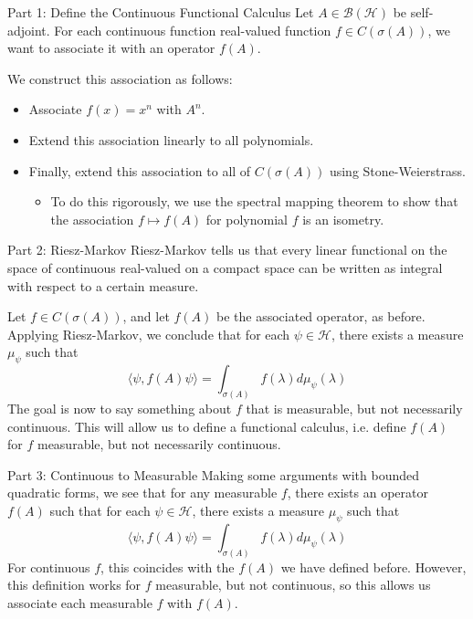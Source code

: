 \documentclass{beamer}
\theoremstyle{plain}
\theoremstyle{definition}
\renewcommand{\l}{\lambda}
\newcommand{\s}{\sigma}
\newcommand{\cB}{{\mathcal B}}
\newcommand{\cH}{{\mathcal H}}
\begin{document}
\begin{frame}{Part 1: Define the Continuous Functional Calculus}
    Let $A \in \cB(\cH)$ be self-adjoint. For each continuous function real-valued function $f \in C(\s(A))$, we want to associate it with an operator $f(A)$.

    \bigskip
    We construct this association as follows:
    \begin{itemize}
        \item Associate $f(x) = x^n$ with $A^n$.
        \item Extend this association linearly to all polynomials.
        \item Finally, extend this association to all of $C(\s(A))$ using Stone-Weierstrass.
            \begin{itemize}
                \item To do this rigorously, we use the spectral mapping theorem to show that the association $f \mapsto f(A)$ for polynomial $f$ is an isometry.
            \end{itemize}
    \end{itemize}
\end{frame}

\begin{frame}{Part 2: Riesz-Markov}
    Riesz-Markov tells us that every linear functional on the space of continuous real-valued on a compact space can be written as integral with respect to a certain measure.

    \medskip
    Let $f \in C(\s(A))$, and let $f(A)$ be the associated operator, as before. Applying Riesz-Markov, we conclude that for each $\psi \in \cH$, there exists a measure $\mu_\psi$ such that
    \[
        \langle \psi, f(A)\psi \rangle = \int_{\s(A)} f(\l)d\mu_\psi(\l)
    \]
    The goal is now to say something about $f$ that is measurable, but not necessarily continuous. This will allow us to define a functional calculus, i.e. define $f(A)$ for $f$ measurable, but not necessarily continuous.
\end{frame}

\begin{frame}{Part 3: Continuous to Measurable}
    Making some arguments with bounded quadratic forms, we see that for any measurable $f$, there exists an operator $f(A)$ such that for each $\psi \in \cH$, there exists a measure $\mu_\psi$ such that
    \[
        \langle \psi, f(A)\psi \rangle = \int_{\s(A)} f(\l)d\mu_\psi(\l)
    \]
    For continuous $f$, this coincides with the $f(A)$ we have defined before. However, this definition works for $f$ measurable, but not continuous, so this allows us associate each measurable $f$ with $f(A)$.
\end{frame}
\end{document}
